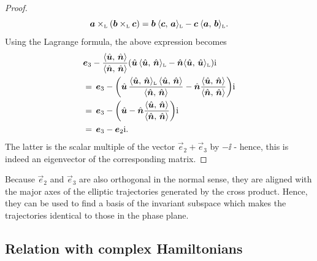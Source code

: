 \begin{proof}
$$ 
    \lorcrossp{\vec{a}}{\qty(\lorcrossp{\vec{b}}{\vec{c}})} 
   = \vec{b}\:\lorinner{\vec{c}}{\vec{a}} - \vec{c}\:\lorinner{\vec{a}}{\vec{b}}. 
$$
Using the Lagrange formula, the above expression becomes
    \begin{equation*}
        \begin{split}
            & \vec{e}_3 - \frac{ \inner{\uvec{u}}{\uvec{n}} }{ \inner{\uvec{n}}{\uvec{n}} }\qty(\uvec{u}\,\lorinner{\uvec{u}}{\uvec{n}} - \uvec{n}\lorinner{\uvec{u}}{\uvec{u}})\ii \\
            & =\, \vec{e}_3 - \qty(\uvec{u}\,\frac{ \lorinner{\uvec{u}}{\uvec{n}} \, \inner{\uvec{u}}{\uvec{n}} }{ \inner{\uvec{n}}{\uvec{n}} } - \uvec{n}\frac{ \inner{\uvec{u}}{\uvec{n}} }{ \inner{\uvec{n}}{\uvec{n}} })\ii \\
            & =\, \vec{e}_3 - \qty(\uvec{u} - \uvec{n}\frac{ \inner{\uvec{u}}{\uvec{n}} }{ \inner{\uvec{n}}{\uvec{n}} })\ii \\
            & =\, \vec{e}_3 - \vec{e}_2\ii. 
        \end{split}
    \end{equation*}
    The latter is the scalar multiple of the vector $\vec{e}_2 + \vec{e}_3$ by $-\ii$ - hence, this is indeed an eigenvector of the corresponding matrix.
\end{proof}
Because $\vec{e}_2$ and $\vec{e}_3$ are also orthogonal in the normal sense, they are aligned with the major axes of the elliptic trajectories generated by the cross product. Hence, they can be used to find a basis of the invariant subspace which makes the trajectories identical to those in the phase plane.

\subsection{Relation with complex Hamiltonians}
\label{ssec:complex_ham}
